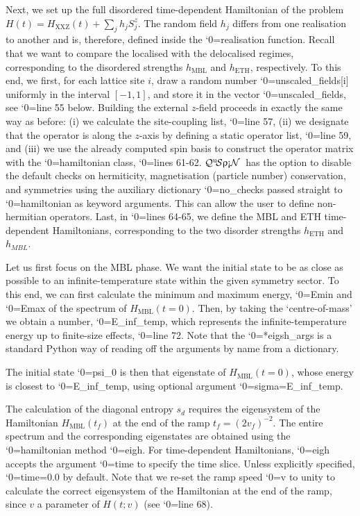\documentclass{SciPost}
\newcommand\0{\scalebox{-1}[1]{0}}
\let\svttfamily\ttfamily
\renewcommand\ttfamily{\svttfamily\catcode`0=\active }
\renewcommand\texttt{\bgroup\ttfamily\texttthelp}
\def\texttthelp#1{#1\egroup}
\newcommand{\qspin}{$\mathcal{Q}^{\mathrm{u}}\!\mathcal{S}\uprho\mathrm{\text{\textexclamdown}}\mathcal{N}$}
\begin{document}

%
Next, we set up the full disordered time-dependent Hamiltonian of the problem $H(t) = H_\mathrm{XXZ}(t) + \sum_j h_jS^z_j$. The random field $h_j$ differs from one realisation to another and is, therefore, defined inside the \texttt{realisation} function. Recall that we want to compare the localised with the delocalised regimes, corresponding to the disordered strengths $h_\mathrm{MBL}$ and $h_\mathrm{ETH}$, respectively. To this end, we first, for each lattice site $i$, draw a random number \texttt{unscaled\_fields[i]} uniformly in the interval $[-1,1]$, and store it in the vector \texttt{unscaled\_fields}, see \texttt{line 55} below. Building the external $z$-field proceeds in exactly the same way as before: (i) we calculate the site-coupling list, \texttt{line 57}, (ii) we designate that the operator is along the $z$-axis by defining a static operator list, \texttt{line 59}, and (iii) we use the already computed spin basis to construct the operator matrix with the \texttt{hamiltonian} class, \texttt{lines 61-62}. \qspin\ has the option to disable the default checks on hermiticity, magnetisation (particle number) conservation, and symmetries using the auxiliary dictionary \texttt{no\_checks} passed straight to \texttt{hamiltonian} as keyword arguments. This can allow the user to define non-hermitian operators. Last, in \texttt{lines 64-65}, we define the MBL and ETH time-dependent Hamiltonians, corresponding to the two disorder strengths $h_\mathrm{ETH}$ and $h_{MBL}$.  

%
Let us first focus on the MBL phase. We want the initial state to be as close as possible to an infinite-temperature state within the given symmetry sector. To this end, we can first calculate the minimum and maximum energy, \texttt{Emin} and \texttt{Emax} of the spectrum of $H_\mathrm{MBL}(t=0)$. Then, by taking the `centre-of-mass' we obtain a number, \texttt{E\_inf\_temp}, which represents the infinite-temperature energy up to finite-size effects, \texttt{line 72}. Note that the \texttt{**eigsh\_args} is a standard Python way of reading off the arguments by name from a dictionary.

%
The initial state \texttt{psi\_0} is then that eigenstate of $H_\mathrm{MBL}(t=0)$, whose energy is closest to \texttt{E\_inf\_temp}, using optional argument \texttt{sigma=E\_inf\_temp}.

%
The calculation of the diagonal entropy $s_d$ requires the eigensystem of the Hamiltonian $H_\mathrm{MBL}(t_f)$ at the end of the ramp $t_f=(2v_f)^{-2}$. The entire spectrum and the corresponding eigenstates are obtained using the \texttt{hamiltonian} method \texttt{eigh}. For time-dependent Hamiltonians, \texttt{eigh} accepts the argument \texttt{time} to specify the time slice. Unless explicitly specified, \texttt{time=0.0} by default. Note that we re-set the ramp speed \texttt{v} to unity to calculate the correct eigensystem of the Hamiltonian at the end of the ramp, since $v$ a parameter of $H(t;v)$ (see \texttt{line 68}).
\end{document}
